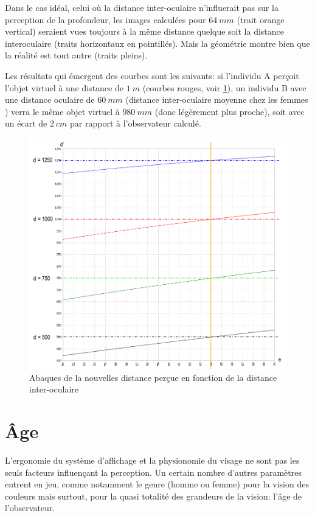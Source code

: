 	\par Dans le cas idéal, celui où la distance inter-oculaire n'influerait pas sur la perception de la profondeur, les images calculées pour $64~mm$ (trait orange vertical) seraient vues toujours à la même distance quelque soit la distance interoculaire (traits horizontaux en pointillés). Mais la géométrie montre bien que la réalité est tout autre (traits pleins).
	
	\par Les résultats qui émergent des courbes sont les suivants: si l'individu A perçoit l'objet virtuel à une distance de $1~m$ (courbes rouges, voir \ref{fig:abaque_dio}), un individu B avec une distance oculaire de $60~mm$ (distance inter-oculaire moyenne chez les femmes \citep{dodgson_variation_2004}) verra le même objet virtuel à $980~mm$ (donc légèrement plus proche), soit avec un écart de $2~cm$ par rapport à l'observateur calculé.
	
	\begin{figure}
		\centering
		\includegraphics[scale=.8]{Figures/AbaqueDIO}
		\caption{Abaques de la nouvelles distance perçue en fonction de la distance inter-oculaire}
		\label{fig:abaque_dio}
	\end{figure}
	
	\section{Âge}
	\par L'ergonomie du système d'affichage et la physionomie du visage ne sont pas les seuls facteurs influençant la perception. Un certain nombre d'autres paramètres entrent en jeu, comme notamment le genre (homme ou femme) pour la vision des couleurs \citep{fairchild_human_2005} mais surtout, pour la quasi totalité des grandeurs de la vision: l'âge de l'observateur.
	
